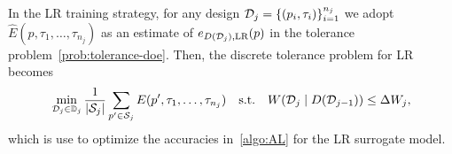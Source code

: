 In the LR training strategy, for any design $\mathcal D_j = \{ (p_i, \tau_i) \}_{i=1}^{n_j}$ we adopt $\hat{E} (p, \tau_1, \dots, \tau_{n_j})$ as an estimate of $e_{D(\mathcal D_j), \text{LR}}(p)$ in the tolerance problem~\eqref{prob:tolerance-doe}.
Then, the discrete tolerance problem for LR becomes
\begin{equation}\label{prob:discrete-tol-LR}       
    \min_{\mathcal D_{j} \in \mathbb D_j} \frac{1}{|\mathcal S_j|} \sum_{p' \in \mathcal S_j} E(p', \tau_1, \dots, \tau_{n_j})  \quad \text{s.t.} 
    \quad W(\mathcal D_{j} \mid D(\mathcal D_{j-1}) ) \le \Delta W_j, 
\end{equation} 
which is use to optimize the accuracies in~\ref{algo:AL} for the LR surrogate model.